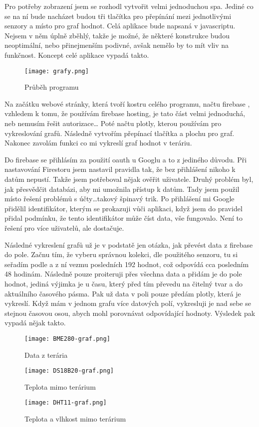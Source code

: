 Pro potřeby zobrazení jsem se rozhodl vytvořit velmi jednoduchou \gls{spa}. Jediné co se na ní bude nacházet budou tři 
tlačítka pro přepínání mezi jednotlivými senzory a místo pro graf hodnot. Celá aplikace bude napsaná v javascriptu. 
Nejsem v něm úplně zběhlý, takže je možné, že některé konstrukce budou neoptimální, nebo přinejmenším podivné, avšak 
nemělo by to mít vliv na funkčnost. Koncept celé aplikace vypadá takto.

\begin{figure}[H]
  \centering
  \texttt{[image: grafy.png]}
  \caption{Průběh programu}
\end{figure}

Na začátku webové stránky, která tvoří kostru celého programu, načtu \gls{firebase} , 
vzhledem k tomu, že používám \gls{firebase} hosting, je tato část velmi jednoduchá, neb nemusím řešit autorizace\ldots 
Poté načtu  \gls{plotly}, kterou používám pro vykreslování grafů. Následně vytvořím 
přepínací tlačítka a plochu pro graf. Nakonec zavolám funkci co mi vykreslí graf hodnot v teráriu.

Do \gls{firebase} se přihlásím za použití \gls{oauth} u Googlu a to z jediného důvodu. Při nastavování Firestoru jsem 
nastavil pravidla tak, že bez přihlášení nikoho k datům nepustí. Takže jsem potřeboval nějak ověřit uživatele. Druhý 
problém byl, jak přesvědčit databázi, aby mi umožnila přístup k datům. Tady jsem použil místo řešení problémů 
s účty\ldots takový špinavý trik. Po přihlášení mi Google přidělil identifikátor, kterým se prokazuji vůči aplikaci, 
když jsem do pravidel přidal podmínku, že tento identifikátor může číst data, vše fungovalo. Není to řešení pro více 
uživatelů, ale dostačuje.

Následné vykreslení grafů už je v podstatě jen otázka, jak převést data z \gls{firebase} do pole. Začnu tím, že vyberu 
správnou kolekci, dle použitého senzoru, tu si seřadím podle  a z ní vezmu posledních 192 
hodnot, což odpovídá cca posledním 48 hodinám. Následně pouze proiteruji přes všechna data a přidám je do pole hodnot, 
jediná výjimka je u času, který před tím převedu na čitelný tvar a do aktuálního časového pásma. Pak už data v poli 
pouze předám  \gls{plotly}, která je vykreslí. Když mám v jednom grafu více datových polí, 
vykresluji je nad sebe se stejnou časovou osou, abych mohl porovnávat odpovídající hodnoty. Výsledek pak vypadá nějak 
takto.

\begin{figure}[H]
    \centering
    \texttt{[image: BME280-graf.png]}
    \caption{Data z terária}
\end{figure}
\begin{figure}[H]
    \centering
    \texttt{[image: DS18B20-graf.png]}
    \caption{Teplota mimo terárium}
\end{figure}
\begin{figure}[H]
    \centering
    \texttt{[image: DHT11-graf.png]}
    \caption{Teplota a vlhkost mimo terárium}
\end{figure}
